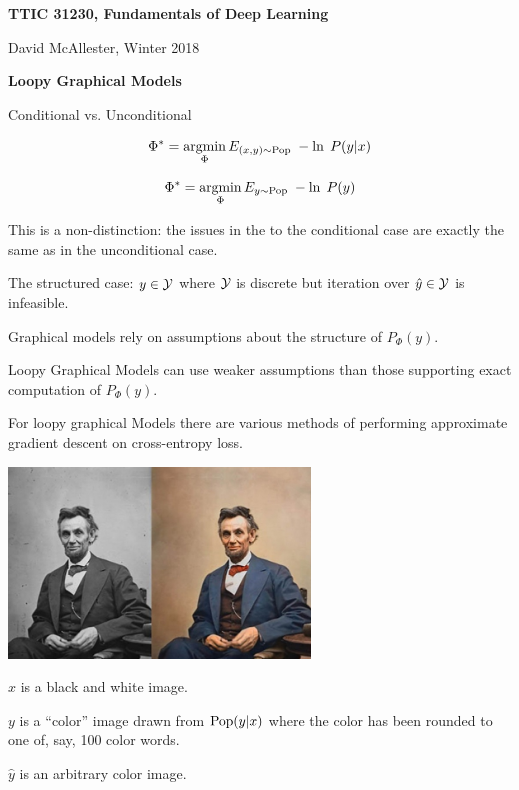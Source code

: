 




{\Huge

  \centerline{\bf TTIC 31230, Fundamentals of Deep Learning}
  \bigskip
  \centerline{David McAllester, Winter 2018}
  \vfill
  \centerline{\bf Loopy Graphical Models}
\vfill
\vfill
\vfill
{}

Conditional vs. Unconditional

\vfill
$$\Phi^* = \operatorname*{argmin}_\Phi E_{(x,y) \sim \mathrm{Pop}}\;-\ln \;P(y|x)$$

\vfill
$$\Phi^* = \operatorname*{argmin}_\Phi E_{y \sim \mathrm{Pop}}\;-\ln \;P(y)$$

\vfill
This is a non-distinction: the issues in the to the conditional case
are exactly the same as in the unconditional case.


The structured case: $y \in {\cal Y}$ where ${\cal Y}$ is discrete but iteration over $\hat{y} \in {\cal Y}$ is infeasible.

\vfill
{\color{red} Graphical models rely on assumptions about the structure of $P_\Phi(y)$.}

\vfill
{\color{red} Loopy Graphical Models can use weaker assumptions than those supporting exact computation of $P_\Phi(y)$.}

\vfill
{\color{red} For loopy graphical Models there are various methods of performing approximate gradient descent on cross-entropy loss.}


\centerline{\includegraphics[height = 2in]{../images/colorization}}

$x$ is a black and white image.

\vfill
$y$ is a ``color'' image drawn from $\mathrm{Pop}(y|x)$ where the color has been rounded to one of, say, 100 color words.

\vfill
$\hat{y}$ is an arbitrary color image.

}
